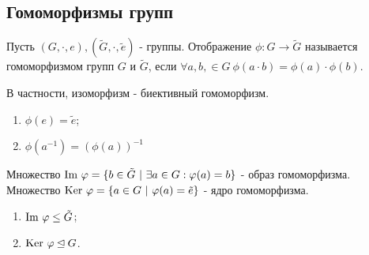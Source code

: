 \setcounter{thcount}{0}
\setcounter{concount}{0}
\setcounter{subthcount}{0}

\subsection{Гомоморфизмы групп}
\begin{definition}
    Пусть $(G, \cdot, e), (\tilde{G}, \cdot, \tilde{e})$ - группы. Отображение $\phi: G \rightarrow \tilde{G}$ называется гомоморфизмом групп $G$ и $\tilde{G}$, если $\forall a, b, \in G \ \phi(a\cdot b) = \phi(a)\cdot\phi(b)$.
\end{definition}
\begin{remark}
    В частности, изоморфизм - биективный гомоморфизм.
\end{remark}
\begin{subtheorem}\tab
    \begin{enumerate}
        \item $\phi(e) = \tilde{e}$;
        \item $\phi(a^{-1}) = (\phi(a))^{-1}$
    \end{enumerate}
\end{subtheorem}
\begin{definition}
    Множество $\textup{Im } \phi = \{b \in \tilde{G} \ | \ \exists a \in G: \phi(a) = b\}$ - образ гомоморфизма.
    Множество $\textup{Ker } \phi = \{a \in G \ | \ \phi(a) = \tilde{e}\}$ - ядро гомоморфизма.
\end{definition}
\begin{subtheoremnum}\tab
    \begin{enumerate}
        \item $\textup{Im } \phi \leq \tilde{G}$;
        \item $\textup{Ker } \phi \unlhd G$.
    \end{enumerate}
\end{subtheoremnum}

